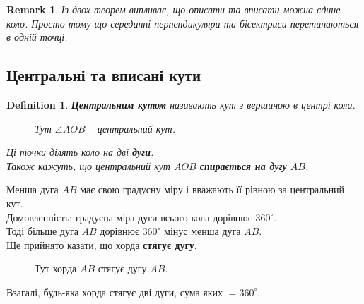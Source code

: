 \documentclass[a4paper, 10pt]{article}
\theoremstyle{theoremdd}
\theoremstyle{theoremdd}
\theoremstyle{theoremdd}
\newtheorem{definition}[theorem]{Definition}
\theoremstyle{theoremdd}
\theoremstyle{theoremdd}
\theoremstyle{theoremdd}
\theoremstyle{theoremdd}
\newtheorem{remark}[theorem]{Remark}
\theoremstyle{theoremdd}
\theoremstyle{theoremdd}
\begin{document}
\begin{remark}
Із двох теорем випливає, що описати та вписати можна єдине коло. Просто тому що серединні перпендикуляри та бісектриси перетинаються в одній точці.
\end{remark}

\subsection{Центральні та вписані кути}
\begin{definition}
\textbf{Центральним кутом} називають кут з вершиною в центрі кола.
\begin{figure}[H]
\centering
{}
\caption*{Тут $\angle AOB$ -- центральний кут.}
\end{figure}
Ці точки ділять коло на дві \textbf{дуги}.\\
Також кажуть, що центральний кут $AOB$ \textbf{спирається на дугу} $AB$.
\end{definition}
Менша дуга $AB$ має свою градусну міру і вважають її рівною за центральний кут.\\
Домовленність: градусна міра дуги всього кола дорівнює $360^\circ$.\\
Тоді більше дуга $AB$ дорівнює $360^\circ$ мінус менша дуга $AB$.
\bigskip \\
Ще прийнято казати, що хорда \textbf{стягує дугу}.
\begin{figure}[H]
\centering
{}
\caption*{Тут хорда $AB$ стягує дугу $AB$.}
\end{figure}
Взагалі, будь-яка хорда стягує дві дуги, сума яких $=360^\circ$.
\end{document}
